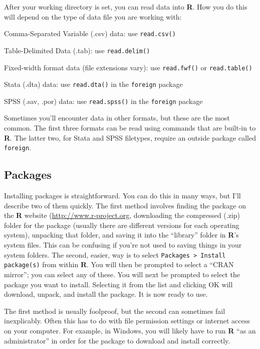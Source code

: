 \documentclass[12pt]{article}\usepackage[]{graphicx}\usepackage[]{color}
\begin{document}
After your working directory is set, you can read data into \textbf{R}.  How you do this will depend on the type of data file you are working with:
\begin{itemize*}
\item Comma-Separated Variable (.csv) data: use \verb|read.csv()|
\item Table-Delimited Data (.tab): use \verb|read.delim()|
\item Fixed-width format data (file extensions vary): use \verb|read.fwf()| or \verb|read.table()|
\item Stata (.dta) data: use \verb|read.dta()| in the \verb|foreign| package
\item SPSS (.sav, .por) data: use \verb|read.spss()| in the \verb|foreign| package
\end{itemize*}
Sometimes you'll encounter data in other formats, but these are the most common. The first three formats can be read using commands that are built-in to \textbf{R}. The latter two, for Stata and SPSS filetypes, require an outside package called \verb|foreign|.

\subsection{Packages}
Installing packages is straightforward. You can do this in many ways, but I'll describe two of them quickly. The first method involves finding the package on the \textbf{R} website (\url{http://www.r-project.org}, downloading the compressed (.zip) folder for the package (usually there are different versions for each operating system), unpacking that folder, and saving it into the ``library'' folder in \textbf{R}'s system files. This can be confusing if you're not used to saving things in your system folders. The second, easier, way is to select \verb|Packages > Install package(s)| from within \textbf{R}. You will then be prompted to select a ``CRAN mirror''; you can select any of these. You will next be prompted to select the package you want to install. Selecting it from the list and clicking OK will download, unpack, and install the package. It is now ready to use.

The first method is usually foolproof, but the second can sometimes fail inexplicably. Often this has to do with file permission settings or internet access on your computer. For example, in Windows, you will likely have to run \textbf{R} ``as an administrator'' in order for the package to download and install correctly.
\end{document}

